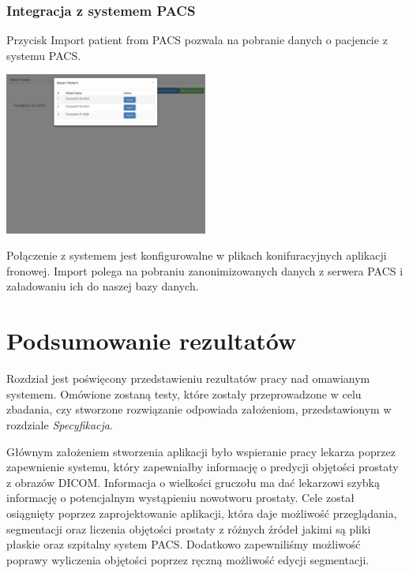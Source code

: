 \documentclass[a4paper,11pt,twoside]{report}
\theoremstyle{definition}
\begin{document}
\subsection{Integracja z systemem PACS}

Przycisk Import patient from PACS pozwala na pobranie danych o pacjencie z systemu PACS.

\begin{minipage}{\linewidth}
	\centering
	\includegraphics[width=0.5\textwidth]{FrontScreen/PACS/pacs.png}
\end{minipage}

Połączenie z systemem jest konfigurowalne w plikach konifuracyjnych aplikacji fronowej. Import polega na pobraniu zanonimizowanych danych z serwera PACS i załadowaniu ich do naszej bazy danych.



\chapter{Podsumowanie rezultatów}
Rozdział jest poświęcony przedstawieniu rezultatów pracy nad omawianym systemem. Omówione zostaną testy, które zostały przeprowadzone w celu zbadania, czy stworzone rozwiązanie odpowiada założeniom, przedstawionym w rozdziale \textit{Specyfikacja}. 
\par
Głównym założeniem stworzenia aplikacji było wspieranie pracy lekarza poprzez zapewnienie systemu, który zapewniałby informację o predycji objętości prostaty z obrazów DICOM. Informacja o wielkości gruczołu ma dać lekarzowi szybką informację o potencjalnym wystąpieniu nowotworu prostaty. Cele został osiągnięty poprzez zaprojektowanie aplikacji, która daje możliwość przeglądania, segmentacji oraz liczenia objętości prostaty z różnych źródeł jakimi są pliki płaskie oraz szpitalny system PACS. Dodatkowo zapewniliśmy możliwość poprawy wyliczenia objętości poprzez ręczną możliwość edycji segmentacji. 
\end{document}
